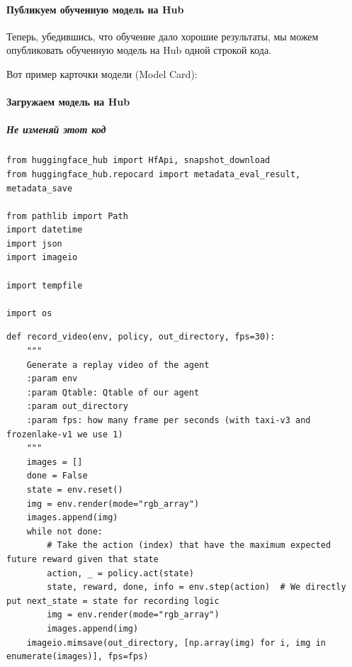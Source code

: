 \documentclass[11pt,a4paper]{article}
\begin{document}
\paragraph{Публикуем обученную модель на Hub}\label{publish-our-trained-model-on-the-hub}

Теперь, убедившись, что обучение дало хорошие результаты, мы можем опубликовать обученную модель на Hub одной строкой кода.

Вот пример карточки модели (Model Card):


\paragraph{Загружаем модель на Hub}\label{push-to-the-hub}

\subparagraph{Не изменяй этот код}\label{do-not-modify-this-code}

\begin{lstlisting}
from huggingface_hub import HfApi, snapshot_download
from huggingface_hub.repocard import metadata_eval_result, metadata_save

from pathlib import Path
import datetime
import json
import imageio

import tempfile

import os
\end{lstlisting}

\begin{lstlisting}
def record_video(env, policy, out_directory, fps=30):
    """
    Generate a replay video of the agent
    :param env
    :param Qtable: Qtable of our agent
    :param out_directory
    :param fps: how many frame per seconds (with taxi-v3 and frozenlake-v1 we use 1)
    """
    images = []
    done = False
    state = env.reset()
    img = env.render(mode="rgb_array")
    images.append(img)
    while not done:
        # Take the action (index) that have the maximum expected future reward given that state
        action, _ = policy.act(state)
        state, reward, done, info = env.step(action)  # We directly put next_state = state for recording logic
        img = env.render(mode="rgb_array")
        images.append(img)
    imageio.mimsave(out_directory, [np.array(img) for i, img in enumerate(images)], fps=fps)
\end{lstlisting}
\end{document}

